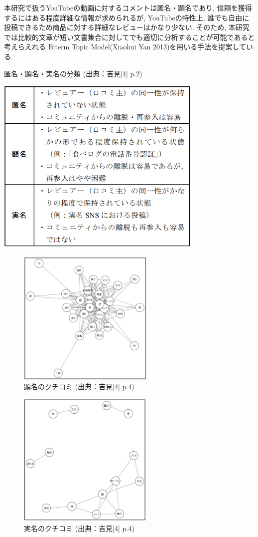 \documentclass{ltjarticle}
\begin{document}
本研究で扱うYouTubeの動画に対するコメントは匿名・顕名であり, 信頼を獲得するにはある程度詳細な情報が求められるが, 
YouTubeの特性上, 誰でも自由に投稿できるため商品に対する詳細なレビューはかなり少ない. 
そのため, 本研究では比較的文章が短い文書集合に対してでも適切に分析することが可能であると考えらえれる
Biterm Topic Model(Xiaohui Yan 2013)を用いる手法を提案している. 
\begin{table}[h]
    \centering
    \caption{匿名・顕名・実名の分類 (出典：吉見[4] p.2)}
    \vspace{5truept}
    \includegraphics[width = 10cm]{images/関連研究4表1.png}
    \label{table:関連研究4表1}
\end{table}
\newpage
\begin{figure}[h]
    \centering
    \includegraphics[width=6.5cm]{images/顕名のクチコミ.png}
    \caption{顕名のクチコミ (出典：吉見[4] p.4)}
    \label{fig:顕名}
\end{figure}
\begin{figure}[h]
    \centering
    \includegraphics[width=6.5cm]{images/実名のクチコミ.png}
    \caption{実名のクチコミ (出典：吉見[4] p.4)}
    \label{fig:実名}
\end{figure}
\end{document}

